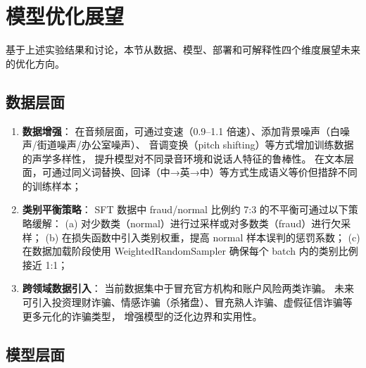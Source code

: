 \documentclass[11pt,a4paper]{ctexart}
\begin{document}
\section{模型优化展望}

基于上述实验结果和讨论，本节从数据、模型、部署和可解释性四个维度展望未来的优化方向。

\subsection{数据层面}

\begin{enumerate}[label=(\arabic*)]
  \item \textbf{数据增强}：
  在音频层面，可通过变速（0.9--1.1 倍速）、添加背景噪声（白噪声/街道噪声/办公室噪声）、
  音调变换（pitch shifting）等方式增加训练数据的声学多样性，
  提升模型对不同录音环境和说话人特征的鲁棒性。
  在文本层面，可通过同义词替换、回译（中→英→中）等方式生成语义等价但措辞不同的训练样本；

  \item \textbf{类别平衡策略}：
  SFT 数据中 fraud/normal 比例约 7:3 的不平衡可通过以下策略缓解：
  (a) 对少数类（normal）进行过采样或对多数类（fraud）进行欠采样；
  (b) 在损失函数中引入类别权重，提高 normal 样本误判的惩罚系数；
  (c) 在数据加载阶段使用 WeightedRandomSampler 确保每个 batch 内的类别比例接近 1:1；

  \item \textbf{跨领域数据引入}：
  当前数据集中于冒充官方机构和账户风险两类诈骗。
  未来可引入投资理财诈骗、情感诈骗（杀猪盘）、冒充熟人诈骗、虚假征信诈骗等更多元化的诈骗类型，
  增强模型的泛化边界和实用性。
\end{enumerate}

\subsection{模型层面}
\end{document}
